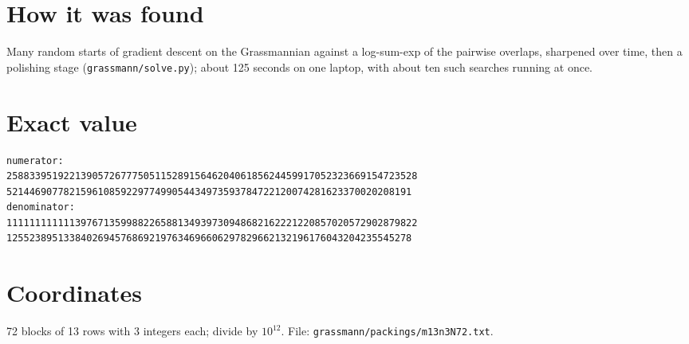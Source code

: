 \documentclass[11pt,a4paper]{article}
\begin{document}
\section{How it was found}
Many random starts of gradient descent on the Grassmannian against a log-sum-exp of the pairwise overlaps, sharpened over time, then a polishing stage (\texttt{grassmann/solve.py}); about 125 seconds on one laptop, with about ten such searches running at once.


\appendix
\section{Exact value}
{\small
\begin{verbatim}
numerator:
258833951922139057267775051152891564620406185624459917052323669154723528
52144690778215961085922977499054434973593784722120074281623370020208191
denominator:
111111111111397671359988226588134939730948682162221220857020572902879822
12552389513384026945768692197634696606297829662132196176043204235545278
\end{verbatim}}

\section{Coordinates}
72 blocks of 13 rows with 3 integers each; divide by $10^{12}$. File: \texttt{grassmann/packings/m13n3N72.txt}.
{\tiny
\begin{multicols}{3}
\end{multicols}}
\end{document}
